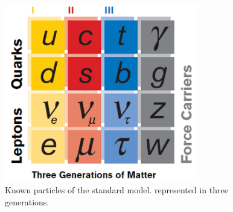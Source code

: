 
 \begin{figure}[htb]
  \begin{center}
    \includegraphics[width=240pt]{Figures/theory-standard-model-symmetry-mag.png}
  \end{center}
  \caption[Particles of the standard model]
	  {Known particles of the standard model. 
	    represented in three generations.
	  }
  \label{fig:StandardModel}
 \end{figure}


